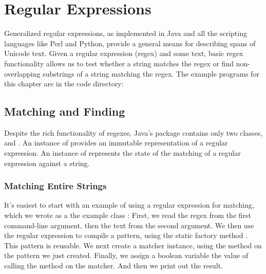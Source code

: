 \chapter{Regular Expressions}\label{chapter:regex}

Generalized regular expressions, as implemented in Java and all the
scripting languages like Perl and Python, provide a general means for
describing spans of Unicode text.  Given a regular expression (regex)
and some text, basic regex functionality allows us to test whether a
string matches the regex or find non-overlapping substrings of a
string matching the regex.
The example programs for this chapter are in the code directory:
%


\section{Matching and Finding}

Despite the rich functionality of regexes, Java's
 package contains only two classes,
 and .  An instance of 
provides an immutable representation of a regular expression.  An
instance of  represents the state of the matching of a
regular expression against a string.

\subsection{Matching Entire Strings}

It's easiest to start with an example of using a regular expression
for matching, which we wrote as a the example class :
%
%
%
First, we read the regex from the first command-line argument, then
the text from the second argument.  We then use the regular expression
to compile a pattern, using the static factory method
.  This pattern is reusable.  We next
create a matcher instance, using the method  on the
pattern we just created.  Finally, we assign a boolean variable
 the value of calling the method  
on the matcher.  And then we print out the result.

